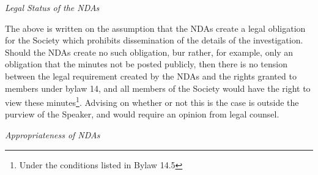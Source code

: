 \begin{longenum}[ label*=\arabic*., align=left]
\begin{longenum}
\item \textit{Legal Status of the NDAs}

 The above is written on the assumption that the NDAs create a legal obligation for the Society which prohibits dissemination of the details of the investigation. Should the NDAs create no such obligation, bur rather, for example, only an obligation that the minutes not be posted publicly, then there is no tension between the legal requirement created by the NDAs and the rights granted to members under bylaw 14, and all members of the Society would have the right to view these minutes\footnote{Under the conditions listed in Bylaw 14.5}.  Advising on whether or not this is the case is outside the purview of the Speaker, and would require an opinion from legal counsel.
 
\item \textit{Appropriateness of NDAs}


\end{longenum}
\end{longenum}
